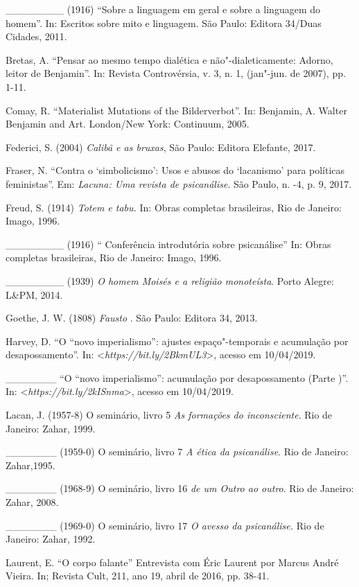 \_\_\_\_\_\_\_\_ (1916) ``Sobre a linguagem em geral e sobre a linguagem
do homem''. In: Escritos sobre mito e linguagem. São Paulo: Editora
34/Duas Cidades, 2011.

Bretas, A. ``Pensar ao mesmo tempo dialética e não"-dialeticamente:
Adorno, leitor de Benjamin''. In: Revista Controvérsia, v. 3, n. 1,
(jan"-jun. de 2007), pp. 1-11.

Comay, R. ``Materialist Mutations of the Bilderverbot''. In: Benjamin,
A. Walter Benjamin and Art. London/New York: Continuum, 2005.

Federici, S. (2004) \emph{Calibã e as bruxas}, São Paulo: Editora
Elefante, 2017.

Fraser, N. ``Contra o `simbolicismo': Usos e abusos do `lacanismo' para
políticas feministas''. Em: \emph{Lacuna: Uma revista de psicanálise}.
São Paulo, n. -4, p. 9, 2017.

Freud, S. (1914) \emph{Totem e tabu.} In: Obras completas brasileiras,
Rio de Janeiro: Imago, 1996.

\_\_\_\_\_\_\_\_ (1916) `` Conferência introdutória sobre psicanálise''
In: Obras completas brasileiras, Rio de Janeiro: Imago, 1996.

\_\_\_\_\_\_\_\_ (1939) \emph{O homem Moisés e a religião monoteísta}.
Porto Alegre: L\&PM, 2014.

Goethe, J. W. (1808) \emph{Fausto }. São Paulo: Editora 34, 2013.

Harvey, D. ``O ``novo imperialismo'': ajustes espaço"-temporais e
acumulação por desapossamento''. In:
\textless{}\emph{https://bit.ly/2BkmUL3}\textgreater{},
acesso em 10/04/2019.

\_\_\_\_\_\_\_ ``O ``novo imperialismo'': acumulação por desapossamento
(Parte )''. In:
\textless{}\emph{https://bit.ly/2kISnma}\textgreater{},
acesso em 10/04/2019.

Lacan, J. (1957-8) O seminário, livro 5 \emph{As formações do
inconsciente}. Rio de Janeiro: Zahar, 1999.

\_\_\_\_\_\_\_ (1959-0) O seminário, livro 7 \emph{A ética da
psicanálise}. Rio de Janeiro: Zahar,1995.

\_\_\_\_\_\_\_ (1968-9) O seminário, livro 16 \emph{de um Outro ao
outro}. Rio de Janeiro: Zahar, 2008.

\_\_\_\_\_\_\_ (1969-0) O seminário, livro 17 \emph{O avesso da
psicanálise.} Rio de Janeiro: Zahar, 1992.

Laurent, E. ``O corpo falante'' Entrevista com Éric Laurent por Marcus
André Vieira. In; Revista Cult, 211, ano 19, abril de 2016, pp. 38-41.

